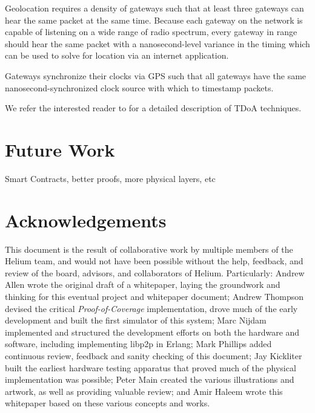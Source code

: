 \documentclass[letterpaper,11pt]{article}
\def\proofofcoverage/{\emph{Proof-of-Coverage}}
\begin{document}
Geolocation requires a density of gateways such that at least three gateways can hear the same packet at the same time. Because each gateway on the network is capable of listening on a wide range of radio spectrum, every gateway in range should hear the same packet with a nanosecond-level variance in the timing which can be used to solve for location via an internet application.\newline

Gateways synchronize their clocks via GPS such that all gateways have the same nanosecond-synchronized clock source with which to timestamp packets.\newline

We refer the interested reader to\cite{tdoa} for a detailed description of TDoA techniques.

\newpage

\section{Future Work}

Smart Contracts, better proofs, more physical layers, etc

\newpage

\section{Acknowledgements}

This document is the result of collaborative work by multiple members of the Helium team, and would not have been possible without the help, feedback, and review of the board, advisors, and collaborators of Helium. Particularly: Andrew Allen wrote the original draft of a whitepaper, laying the groundwork and thinking for this eventual project and whitepaper document; Andrew Thompson devised the critical \proofofcoverage/ implementation, drove much of the early development and built the first simulator of this system; Marc Nijdam implemented and structured the development efforts on both the hardware and software, including implementing libp2p in Erlang; Mark Phillips added continuous review, feedback and sanity checking of this document; Jay Kickliter built the earliest hardware testing apparatus that proved much of the physical implementation was possible; Peter Main created the various illustrations and artwork, as well as providing valuable review; and Amir Haleem wrote this whitepaper based on these various concepts and works.\newline
\end{document}
